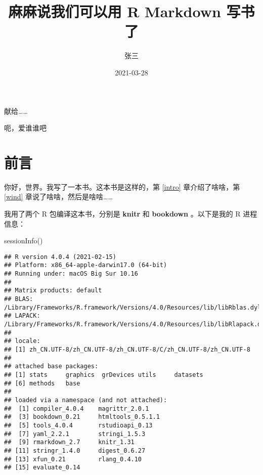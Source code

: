 \documentclass[]{ctexbook}
\title{麻麻说我们可以用 R Markdown 写书了}
\author{张三}
\date{2021-03-28}
\newenvironment{Shaded}{\begin{snugshade}}{\end{snugshade}}
\newcommand{\FunctionTok}[1]{\textcolor[rgb]{0.00,0.00,0.00}{#1}}
\newcommand{\NormalTok}[1]{#1}
\begin{document}
\maketitle


\thispagestyle{empty}

\begin{center}
献给……

呃，爱谁谁吧
\end{center}

\setlength{\abovedisplayskip}{-5pt}
\setlength{\abovedisplayshortskip}{-5pt}

{
\setcounter{tocdepth}{2}
\tableofcontents
}
\listoftables
\listoffigures
\hypertarget{ux524dux8a00}{%
\chapter*{前言}\label{ux524dux8a00}}


你好，世界。我写了一本书。这本书是这样的，第 \ref{intro} 章介绍了啥啥，第 \ref{wind} 章说了啥啥，然后是啥啥\ldots\ldots{}

我用了两个 R 包编译这本书，分别是 \textbf{knitr} \citep{xie2015} 和 \textbf{bookdown} \citep{R-bookdown}。以下是我的 R 进程信息：

\begin{Shaded}
\begin{Highlighting}[]
\FunctionTok{sessionInfo}\NormalTok{()}
\end{Highlighting}
\end{Shaded}

\begin{verbatim}
## R version 4.0.4 (2021-02-15)
## Platform: x86_64-apple-darwin17.0 (64-bit)
## Running under: macOS Big Sur 10.16
## 
## Matrix products: default
## BLAS:   /Library/Frameworks/R.framework/Versions/4.0/Resources/lib/libRblas.dylib
## LAPACK: /Library/Frameworks/R.framework/Versions/4.0/Resources/lib/libRlapack.dylib
## 
## locale:
## [1] zh_CN.UTF-8/zh_CN.UTF-8/zh_CN.UTF-8/C/zh_CN.UTF-8/zh_CN.UTF-8
## 
## attached base packages:
## [1] stats     graphics  grDevices utils     datasets 
## [6] methods   base     
## 
## loaded via a namespace (and not attached):
##  [1] compiler_4.0.4    magrittr_2.0.1   
##  [3] bookdown_0.21     htmltools_0.5.1.1
##  [5] tools_4.0.4       rstudioapi_0.13  
##  [7] yaml_2.2.1        stringi_1.5.3    
##  [9] rmarkdown_2.7     knitr_1.31       
## [11] stringr_1.4.0     digest_0.6.27    
## [13] xfun_0.21         rlang_0.4.10     
## [15] evaluate_0.14
\end{verbatim}
\end{document}
